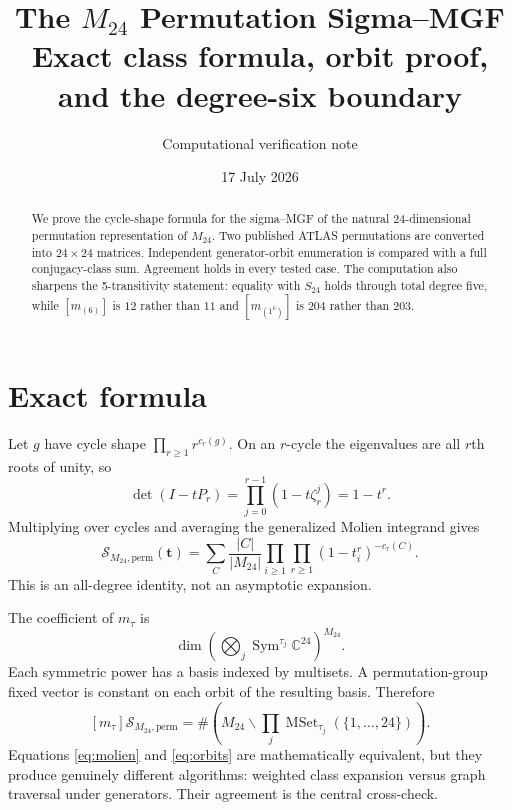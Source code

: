 \documentclass[11pt]{article}
\title{\color{navy}\bfseries The $M_{24}$ Permutation Sigma--MGF\\
\large Exact class formula, orbit proof, and the degree-six boundary}
\author{Computational verification note}\date{17 July 2026}
\newcommand{\Sgm}{\mathcal S}
\begin{document}
\maketitle

\begin{abstract}
We prove the cycle-shape formula for the sigma--MGF of the natural
$24$-dimensional permutation representation of $M_{24}$.  Two published
ATLAS permutations are converted into $24\times24$ matrices.  Independent
generator-orbit enumeration is compared with a full conjugacy-class sum.
Agreement holds in every tested case.  The computation also sharpens the
5-transitivity statement: equality with $S_{24}$ holds through total degree
five, while $[m_{(6)}]$ is $12$ rather than $11$ and
$[m_{(1^6)}]$ is $204$ rather than $203$.
\end{abstract}

\section{Exact formula}
Let $g$ have cycle shape $\prod_{r\geq1}r^{c_r(g)}$.  On an $r$-cycle the
eigenvalues are all $r$th roots of unity, so
\[
\det(I-tP_r)=\prod_{j=0}^{r-1}(1-t\zeta_r^j)=1-t^r.
\]
Multiplying over cycles and averaging the generalized Molien integrand gives
\begin{equation}\label{eq:molien}
\boxed{
\Sgm_{M_{24},\mathrm{perm}}(\mathbf t)
=\sum_C\frac{|C|}{|M_{24}|}
\prod_{i\geq1}\prod_{r\geq1}(1-t_i^r)^{-c_r(C)}.}
\end{equation}
This is an all-degree identity, not an asymptotic expansion.

The coefficient of $m_\tau$ is
\[
\dim\left(\bigotimes_j\operatorname{Sym}^{\tau_j}\mathbb C^{24}\right)^{M_{24}}.
\]
Each symmetric power has a basis indexed by multisets.  A permutation-group
fixed vector is constant on each orbit of the resulting basis.  Therefore
\begin{equation}\label{eq:orbits}
[m_\tau]\Sgm_{M_{24},\mathrm{perm}}
=\#\left(M_{24}\backslash\prod_j
\operatorname{MSet}_{\tau_j}(\{1,\ldots,24\})\right).
\end{equation}
Equations \eqref{eq:molien} and \eqref{eq:orbits} are mathematically
equivalent, but they produce genuinely different algorithms: weighted class
expansion versus graph traversal under generators.  Their agreement is the
central cross-check.
\end{document}
